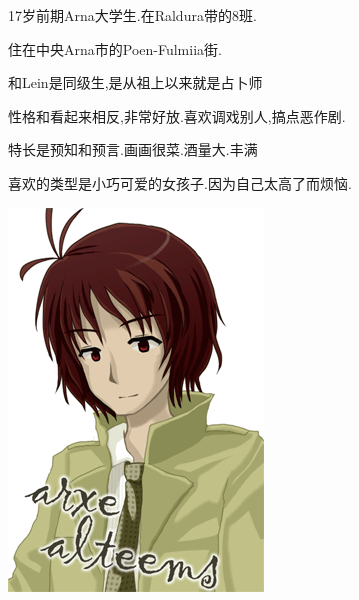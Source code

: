 \hfill
\begin{minipage}[b]{0.6\linewidth}
17岁前期Arna大学生.在Raldura带的8班.

住在中央Arna市的Poen-Fulmiia街.

和Lein是同级生,是从祖上以来就是占卜师

性格和看起来相反,非常好放.喜欢调戏别人,搞点恶作剧.

特长是预知和预言.画画很菜.酒量大.{\textcolor[rgb]{1,0.92,0.92}{丰满}}

喜欢的类型是小巧可爱的女孩子.因为自己太高了而烦恼.
\end{minipage}

\begin{minipage}[b]{0.4\linewidth}

\includegraphics[width=\linewidth]{pngs/arsen.png}

\end{minipage}
